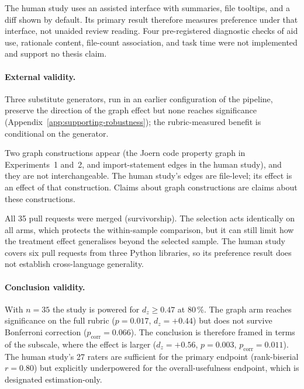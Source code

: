 The human study uses an assisted interface with summaries, file tooltips, and
a diff shown by default. Its primary result therefore measures preference
under that interface, not unaided review reading. Four pre-registered
diagnostic checks of aid use, rationale content, file-count association, and
task time were not implemented and support no thesis claim.

\paragraph{External validity.}
Three substitute generators, run in an earlier configuration of the
pipeline, preserve the direction of the graph effect but none reaches
significance (Appendix~\ref{app:supporting-robustness}); the rubric-measured
benefit is conditional on the generator.

Two graph constructions appear (the Joern code property graph in
Experiments~1 and~2, and import-statement edges in the human study), and
they are not interchangeable. The human study's edges are file-level; its
effect is an effect of that construction. Claims about graph
constructions are claims about these constructions.

All 35 pull requests were merged (survivorship). The selection acts
identically on all arms, which protects the within-sample comparison, but it
can still limit how the treatment effect generalises beyond the selected
sample. The human study covers six pull requests from three Python
libraries, so its preference result does not establish cross-language
generality.

\paragraph{Conclusion validity.}
With $n = 35$ the study is powered for $d_z \geq 0.47$ at 80\,\%. The graph arm
reaches significance on the full rubric ($p = 0.017$,
$d_z = +0.44$) but does not survive Bonferroni correction
($p_{\text{corr}} = 0.066$). The conclusion is therefore framed in
terms of the subscale, where the effect is larger
($d_z = +0.56$, $p = 0.003$,
$p_{\text{corr}} = 0.011$). The human study's 27
raters are sufficient for the primary endpoint (rank-biserial $r = 0.80$)
but explicitly underpowered for the overall-usefulness endpoint, which is
designated estimation-only.
